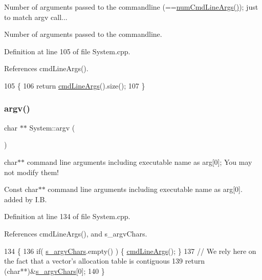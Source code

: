 Number of arguments passed to the commandline (==\hyperlink{namespaceSystem_a45f2f8ee27a6b62a7eb104306db16dc9}{num\+Cmd\+Line\+Args()}); just to match argv call... 

Number of arguments passed to the commandline. 

Definition at line 105 of file System.\+cpp.



References cmd\+Line\+Args().


\begin{DoxyCode}
105                      \{
106   \textcolor{keywordflow}{return} \hyperlink{namespaceSystem_ac5277fb525c07b07bbd94a61e62bc0f5}{cmdLineArgs}().size();
107 \}
\end{DoxyCode}
\mbox{\label{namespaceSystem_ae3520381fd902d4fce860586feeb6c27}} 
\subsubsection{\texorpdfstring{argv()}{argv()}}
{\footnotesize\ttfamily char $\ast$$\ast$ System\+::argv (\begin{DoxyParamCaption}{ }\end{DoxyParamCaption})}



char$\ast$$\ast$ command line arguments including executable name as arg\mbox{[}0\mbox{]}; You may not modify them! 

Const char$\ast$$\ast$ command line arguments including executable name as arg\mbox{[}0\mbox{]}. added by I.\+B. 

Definition at line 134 of file System.\+cpp.



References cmd\+Line\+Args(), and s\+\_\+argv\+Chars.


\begin{DoxyCode}
134                        \{
136   \textcolor{keywordflow}{if}( \hyperlink{System_8cpp_a05afb231f779de83550ec9b6564d14c5}{s\_argvChars}.empty() ) \{ \hyperlink{namespaceSystem_ac5277fb525c07b07bbd94a61e62bc0f5}{cmdLineArgs}(); \}  
137   \textcolor{comment}{// We rely here on the fact that a vector's allocation table is contiguous}
139   \textcolor{keywordflow}{return} (\textcolor{keywordtype}{char}**)&\hyperlink{System_8cpp_a05afb231f779de83550ec9b6564d14c5}{s\_argvChars}[0];
140 \}
\end{DoxyCode}
\mbox{\label{namespaceSystem_ac5277fb525c07b07bbd94a61e62bc0f5}} 
